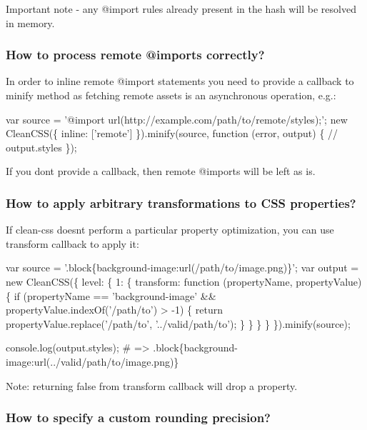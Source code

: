 Important note -\/ any {\ttfamily @import} rules already present in the hash will be resolved in memory.

\subsubsection*{How to process remote {\ttfamily @import}s correctly?}

In order to inline remote {\ttfamily @import} statements you need to provide a callback to minify method as fetching remote assets is an asynchronous operation, e.\+g.\+:


\begin{DoxyCode}
var source = '@import url(http://example.com/path/to/remote/styles);';
new CleanCSS(\{ inline: ['remote'] \}).minify(source, function (error, output) \{
  // output.styles
\});
\end{DoxyCode}


If you don\textquotesingle{}t provide a callback, then remote {\ttfamily @import}s will be left as is.

\subsubsection*{How to apply arbitrary transformations to C\+SS properties?}

If clean-\/css doesn\textquotesingle{}t perform a particular property optimization, you can use {\ttfamily transform} callback to apply it\+:


\begin{DoxyCode}
var source = '.block\{background-image:url(/path/to/image.png)\}';
var output = new CleanCSS(\{
  level: \{
    1: \{
      transform: function (propertyName, propertyValue) \{
        if (propertyName == 'background-image' && propertyValue.indexOf('/path/to') > -1) \{
          return propertyValue.replace('/path/to', '../valid/path/to');
        \}
      \}
    \}
  \}
\}).minify(source);

console.log(output.styles); # => .block\{background-image:url(../valid/path/to/image.png)\}
\end{DoxyCode}


Note\+: returning {\ttfamily false} from {\ttfamily transform} callback will drop a property.

\subsubsection*{How to specify a custom rounding precision?}


